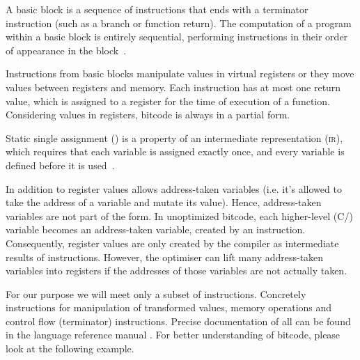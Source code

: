\begin{definition}\label{def:basicblock}
A basic block is a sequence of instructions that ends with a terminator
instruction (such as a branch or function return). The computation of a program
within a basic block is entirely sequential, performing instructions in their
order of appearance in the block~\cite{Rockai15}.
\end{definition}

Instructions from basic blocks manipulate values in virtual registers or
they move values between registers and memory. Each instruction has at most one
return value, which is assigned to a register for the time of execution of a
function. Considering values in registers, \LLVM bitcode is always in a
partial \SSA form.

\begin{definition}\label{def:ssa}
Static single assignment (\SSA{}) is a property of an intermediate representation
(\textsc{ir}), which requires that each variable is assigned exactly once, and every
variable is defined before it is used~\cite{Cytron91}.
\end{definition}

In addition to register values \LLVMIR allows address-taken variables (i.e. it's
allowed to take the address of a variable and mutate its value).
Hence, address-taken variables are not part of the \SSA form. In unoptimized
\LLVM bitcode, each higher-level (C/\Cpp{}) variable becomes an address-taken
variable, created by an  instruction. Consequently, register values are only
created by the compiler as intermediate results of instructions. However, the \LLVM
optimiser can lift many address-taken variables into registers if the addresses
of those variables are not actually taken.

For our purpose we will meet only a subset of \LLVM instructions. Concretely
instructions for manipulation of transformed values, memory operations and
control flow (terminator) instructions. Precise documentation of all can be
found in the \LLVM language reference manual \cite{LLVM:langref}. For better
understanding of \LLVM bitcode, please look at the following example.


